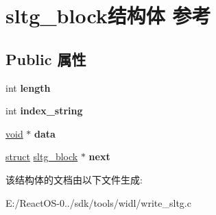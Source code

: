 \hypertarget{structsltg__block}{}\section{sltg\+\_\+block结构体 参考}
\label{structsltg__block}
\subsection*{Public 属性}
\begin{DoxyCompactItemize}
\item 
\mbox{\label{structsltg__block_a73479c5f62e4206ab42a2f73f1ba4716}} 
int {\bfseries length}
\item 
\mbox{\label{structsltg__block_a3fbe1be94518933a8828ec96b8a4404e}} 
int {\bfseries index\+\_\+string}
\item 
\mbox{\label{structsltg__block_aeb70b124e0de4ebfe7d1d26a5b8d3c43}} 
\hyperlink{interfacevoid}{void} $\ast$ {\bfseries data}
\item 
\mbox{\label{structsltg__block_af049d9fe36e460a9b0f2e93ed8f2bea7}} 
\hyperlink{interfacestruct}{struct} \hyperlink{structsltg__block}{sltg\+\_\+block} $\ast$ {\bfseries next}
\end{DoxyCompactItemize}


该结构体的文档由以下文件生成\+:\begin{DoxyCompactItemize}
\item 
E\+:/\+React\+O\+S-\/0../sdk/tools/widl/write\+\_\+sltg.\+c\end{DoxyCompactItemize}
